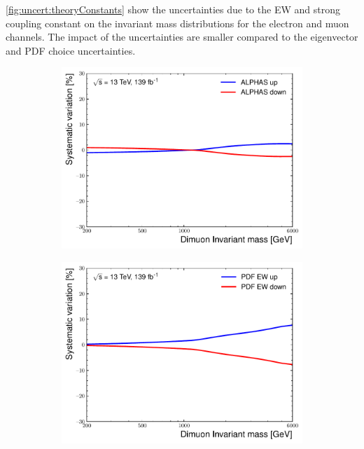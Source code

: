 \cref{fig:uncert:theoryConstants} show the uncertainties due to the EW and strong coupling constant on the invariant mass distributions for the electron and muon channels. The impact of the uncertainties are smaller compared to the eigenvector and PDF choice uncertainties. 
\begin{figure}[h!]
    \centering
    \begin{subfigure}[h]{0.42\textwidth}
        \includegraphics[width=\textwidth]{figures/analysis/datamc/Uncertainties/theory/mm/backgroundTemplate_KF_ALPHAS__1up.pdf}
        \label{fig:uncert:mmalpha}
    \end{subfigure}
    \begin{subfigure}[h]{0.42\textwidth}
        \centering
        \includegraphics[width=\textwidth]{figures/analysis/datamc/Uncertainties/theory/mm/backgroundTemplate_KF_PDF_EW__1up.pdf}

\end{subfigure}
\end{figure}
